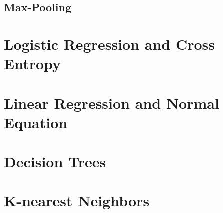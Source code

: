\subsection{Max-Pooling}

\section{Logistic Regression and Cross Entropy}


\section{Linear Regression and Normal Equation}


\section{Decision Trees}


\section{K-nearest Neighbors}

